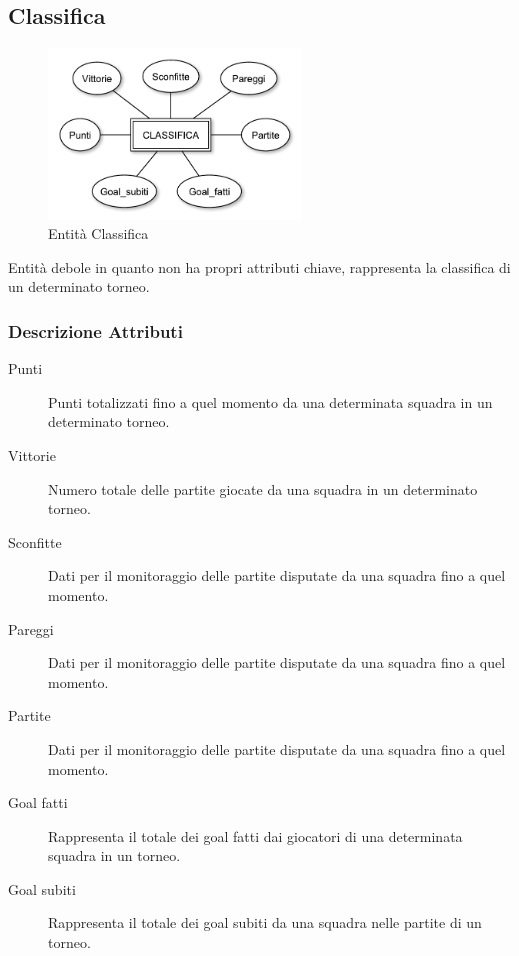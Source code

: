 	\subsection{Classifica}
	
		\begin{figure}[h]
			\centering
			\includegraphics[width=0.6\textwidth]
			{immagini/10-classifica}
			
			\caption{Entità Classifica}
		\end{figure}
		
		Entità debole in quanto non ha propri attributi chiave, rappresenta la classifica di un determinato torneo.
		
		\subsubsection*{Descrizione Attributi}
		
		\begin{description}
			
			\item[Punti]
			Punti totalizzati fino a quel momento da una determinata squadra in un determinato torneo.
			
			\item[Vittorie]
			Numero totale delle partite giocate da una squadra in un determinato torneo.
			
			\item[Sconfitte]
			Dati per il monitoraggio delle partite disputate da una squadra fino a quel momento.
			
			\item[Pareggi]
			Dati per il monitoraggio delle partite disputate da una squadra fino a quel momento.
			
			\item[Partite]
			Dati per il monitoraggio delle partite disputate da una squadra fino a quel momento.
			
			\item[Goal fatti]
			Rappresenta il totale dei goal fatti dai giocatori di una determinata squadra in un torneo.
			
			\item[Goal subiti]
			Rappresenta il totale dei goal subiti da una squadra nelle partite di un torneo.
			
		\end{description}
		
